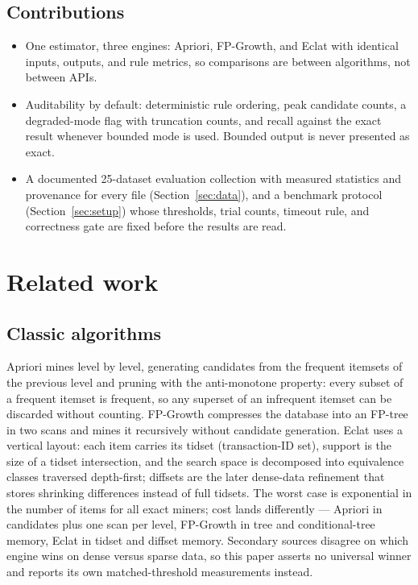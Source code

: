 \documentclass[twocolumn,10pt]{article}
\begin{document}
\subsection{Contributions}
\begin{itemize}
  \item One estimator, three engines: Apriori, FP-Growth, and Eclat
  with identical inputs, outputs, and rule metrics, so comparisons are
  between algorithms, not between APIs.
  \item Auditability by default: deterministic rule ordering, peak
  candidate counts, a degraded-mode flag with truncation counts, and
  recall against the exact result whenever bounded mode is used.
  Bounded output is never presented as exact.
  \item A documented 25-dataset evaluation collection with measured
  statistics and provenance for every file (Section~\ref{sec:data}),
  and a benchmark protocol (Section~\ref{sec:setup}) whose thresholds,
  trial counts, timeout rule, and correctness gate are fixed before the
  results are read.
\end{itemize}

\section{Related work}

\subsection{Classic algorithms}
Apriori \cite{agrawal1994} mines level by level, generating candidates
from the frequent itemsets of the previous level and pruning with the
anti-monotone property: every subset of a frequent itemset is frequent,
so any superset of an infrequent itemset can be discarded without
counting. FP-Growth \cite{han2000,han2004} compresses the database into
an FP-tree in two scans and mines it recursively without candidate
generation. Eclat \cite{zaki2000} uses a vertical layout: each item
carries its tidset (transaction-ID set), support is the size of a
tidset intersection, and the search space is decomposed into
equivalence classes traversed depth-first; diffsets are the later
dense-data refinement that stores shrinking differences instead of full
tidsets. The worst case is exponential in the number of items for all
exact miners; cost lands differently --- Apriori in candidates plus one
scan per level, FP-Growth in tree and conditional-tree memory, Eclat in
tidset and diffset memory. Secondary sources disagree on which engine
wins on dense versus sparse data, so this paper asserts no universal
winner and reports its own matched-threshold measurements instead.
\end{document}
